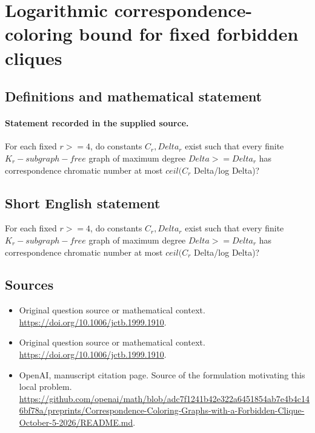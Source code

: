 \documentclass[11pt]{article}
\begin{document}
\section*{Logarithmic correspondence-coloring bound for fixed forbidden cliques}\label{statement}
\subsection{Definitions and mathematical statement}
\paragraph{Statement recorded in the supplied source.}
For each fixed $r>=4$, do constants $C_r,Delta_r$ exist such that every finite $K_r-subgraph-free$ graph of maximum degree $Delta>=Delta_r$ has correspondence chromatic number at most $ceil(C_r$ Delta/log Delta)?
\subsection{Short English statement}
For each fixed $r>=4$, do constants $C_r,Delta_r$ exist such that every finite $K_r-subgraph-free$ graph of maximum degree $Delta>=Delta_r$ has correspondence chromatic number at most $ceil(C_r$ Delta/log Delta)?
\subsection{Sources}
\begin{itemize}
\item[S1] Original question source or mathematical context.
\url{https://doi.org/10.1006/jctb.1999.1910}.
\item[S2] Original question source or mathematical context.
\url{https://doi.org/10.1006/jctb.1999.1910}.
\item[S3] OpenAI, manuscript citation page. Source of the formulation motivating this local problem.
\url{https://github.com/openai/math/blob/adc7f1241b42e322a6451854ab7e4b4c146bf78a/preprints/Correspondence-Coloring-Graphs-with-a-Forbidden-Clique-October-5-2026/README.md}.
\end{itemize}
\end{document}
